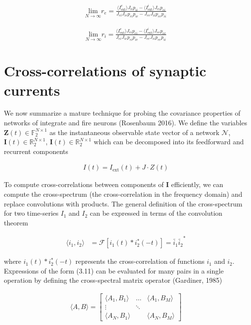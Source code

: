 \documentclass{ucetd}
\begin{document}
\begin{align}
\underset{N\rightarrow \infty}{\mathrm{lim}}r_{e} = \frac{\langle I_{\mathrm{ext}}^{e}\rangle J_{ii}p_{ii} - \langle I_{\mathrm{ext}}^{i}\rangle J_{ei}p_{ei}}{J_{ei}J_{ie}p_{ei}p_{ie} - J_{ee}J_{ii}p_{ee}p_{ii}}
\end{align}

\begin{align}
\underset{N\rightarrow \infty}{\mathrm{lim}}r_{i} = \frac{\langle I_{\mathrm{ext}}^{e}\rangle J_{ei}p_{ei} - \langle I_{\mathrm{ext}}^{i}\rangle J_{ee}p_{ee}}{J_{ei}J_{ie}p_{ei}p_{ie} - J_{ee}J_{ii}p_{ee}p_{ii}}
\end{align}

\section{Cross-correlations of synaptic currents}

We now summarize a mature technique for probing the covariance properties of networks of integrate and fire neurons (Rosenbaum 2016). We define the variables $\mathbf{Z}(t)\in \mathbb{F}_{2}^{N\times 1}$ as the instantaneous observable state vector of a network $\mathcal{N}$, $\mathbf{I}(t)\in \mathbb{R}_{2}^{N\times 1}$, $\mathbf{I}(t)\in \mathbb{R}_{2}^{N\times 1}$ which can be decomposed into its feedforward and recurrent components

\begin{align}
I(t) = I_{\mathrm{ext}}(t) + J\cdot Z(t)
\end{align}

To compute cross-correlations between components of $\mathbf{I}$ efficiently, we can compute the cross-spectrum (the cross-correlation in the frequency domain) and replace convolutions with products. The general definition of the cross-spectrum for two time-series $I_{1}$ and $I_{2}$ can be expressed in terms of the convolution theorem

\begin{align}
\langle i_{1}, i_{2}\rangle &= \mathcal{F}\left[i_{1}(t)*i_{2}^{*}(-t)\right] = \tilde{i_{1}}\tilde{i_{2}}^{*}
\end{align}

where $i_{1}(t)*i_{2}^{*}(-t)$ represents the cross-correlation of functions $i_{1}$ and $i_{2}$. Expressions of the form (3.11) can be evaluated for many pairs in a single operation by defining the cross-spectral matrix operator (Gardiner, 1985)

\begin{align}
\langle A, B\rangle = \begin{bmatrix} 
    \langle A_{1}, B_{1}\rangle  & \dots & \langle A_{1}, B_{M}\rangle\\
    \vdots & \ddots & \\
    \langle A_{N}, B_{1}\rangle &        & \langle A_{N}, B_{M}\rangle
    \end{bmatrix}
\end{align}
\end{document}
